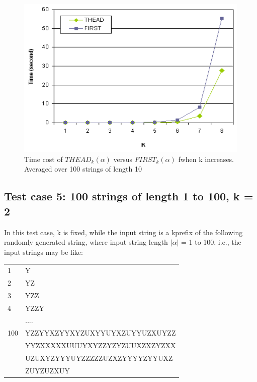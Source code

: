 \documentclass{sig-alternate-05-2015}
\begin{document}
\begin{figure}
\centering
\includegraphics[scale=0.5]{figure5.PNG}
\caption{Time cost of $THEAD_k(\alpha)$ versus $FIRST_k(\alpha)$
fwhen k increases. Averaged over 100 strings of length 10}
\label{fig:5}
\end{figure}


\subsection{Test case 5: 100 strings of length 1 to 100, k = 2}
In this test case, k is fixed, while the input string is a kprefix
of the following randomly generated string, where
input string length $|\alpha|$ = 1 to 100, i.e., the input strings may
be like:\\
\begin{tabular}{ll}
1   & Y                                                                                                   \\
2   & YZ                                                                                                  \\
3   & YZZ                                                                                                 \\
4   & YZZY                                                                                                \\
    & ....                                                                                                \\
100 & YZZYYXZYYXYZUXYYUYXZUYYUZXUYZZ \\
      & YYZXXXXXUUUYXYZZYZYZUUXZXZYZXX \\
      & UZUXYZYYYUYZZZZZUZXZYYYYZYYUXZ \\
      & ZUYZUZXUY
\end{tabular}
\end{document}
